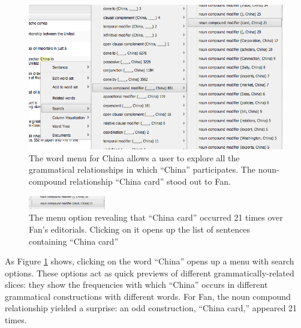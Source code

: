 \documentclass{sig-alternate}
\begin{document}
\begin{figure}[h!]
\includegraphics[width=\textwidth]{fig/chris/01.png}
\caption{The word menu for China allows a user to explore all the grammatical relationships in which ``China'' participates. The noun-compound relationship ``China card'' stood out to Fan. \label{fig:chris01}}
\end{figure}

\begin{figure}[h!]
\includegraphics[width=0.3\textwidth]{fig/chris/01b.png}
\caption{ The menu option revealing that ``China card'' occurred 21 times over Fan's editorials. Clicking on it opens up the list of sentences containing ``China card''  \label{fig:chris01b}}
\end{figure}

As Figure \ref{fig:chris01} shows, clicking on the word ``China'' opens up a menu with search options. These options act as quick previews of different grammatically-related slices: they show the frequencies with which ``China'' occurs in different grammatical constructions with different words.  For Fan, the noun compound relationship yielded a surprise: an odd construction, ``China card,'' appeared 21 times.
\end{document}
